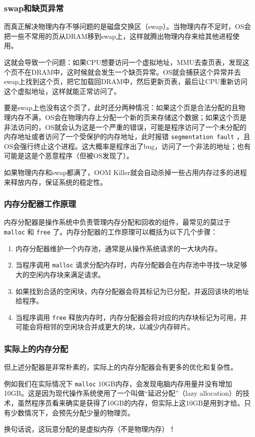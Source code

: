 \documentclass[fontset=none,aspectratio=1610]{ctexbeamer}
\begin{document}
\begin{frame}
    \frametitle{swap和缺页异常}

    而真正解决物理内存不够问题的是磁盘交换区（swap）。当物理内存不足时，OS会把一些不常用的页从DRAM移到swap上，这样就腾出物理内存来给其他进程使用。

    这就会导致一个问题：如果CPU想要访问一个虚拟地址，MMU去查页表，发现这个页不在DRAM中，这时候就会发生一个缺页异常。OS就会捕获这个异常并去swap上找到这个页，把它加载回DRAM中，然后更新页表，最后让CPU重新访问这个虚拟地址，这样就能正常访问了。

    要是swap上也没有这个页了，此时还分两种情况：如果这个页是合法分配的且物理内存不满，OS会在物理内存上分配一个新的页来存储这个数据；如果这个页是非法访问的，OS就会认为这是一个严重的错误，可能是程序访问了一个未分配的内存地址或者访问了一个受保护的内存地址，此时报错 \texttt{segmentation fault} ，且OS会强行终止这个进程。这大概率是程序出了bug，访问了一个非法的地址；也有可能是这是个恶意程序（但被OS发现了）。

    如果物理内存和swap都满了，OOM Killer就会自动杀掉一些占用内存过多的进程来释放内存，保证系统的稳定性。

\end{frame}

\begin{frame}
    \frametitle{内存分配器工作原理}

    内存分配器是操作系统中负责管理内存分配和回收的组件，最常见的莫过于 \texttt{malloc} 和 \texttt{free} 了。内存分配器的工作原理可以概括为以下几个步骤：
    \begin{enumerate}
        \item 内存分配器维护一个内存池，通常是从操作系统请求的一大块内存。
        \item 当程序调用 \texttt{malloc} 请求分配内存时，内存分配器会在内存池中寻找一块足够大的空闲内存块来满足请求。
        \item 如果找到合适的空闲块，内存分配器会将其标记为已分配，并返回该块的地址给程序。
        \item 当程序调用 \texttt{free} 释放内存时，内存分配器会将对应的内存块标记为可用，并可能会将相邻的空闲块合并成更大的块，以减少内存碎片。
    \end{enumerate}

\end{frame}

\begin{frame}
    \frametitle{实际上的内存分配}

    但上述分配器是非常朴素的，实际上的内存分配器会有更多的优化和复杂性。

    例如我们在实际情况下 \texttt{malloc} 10GB内存，会发现电脑内存用量并没有增加10GB。这是因为现代操作系统使用了一个叫做“延迟分配”（lazy allocation）的技术，虽然程序员看来确实是获得了10GB的内存，但实际上这10GB是用到才给。只有少数情况下，会预先分配少量的物理页。

    换句话说，这玩意分配的是虚拟内存（不是物理内存）！

\end{frame}
\end{document}
